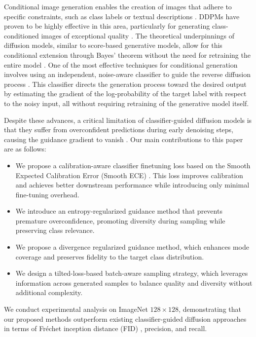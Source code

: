 \documentclass{article}
\begin{document}
Conditional image generation enables the creation of images that adhere to specific constraints, such as class labels or textual descriptions \cite{ramesh2021zero, rombach2022high, liu2024sora}. DDPMs have proven to be highly effective in this area, particularly for generating class-conditioned images of exceptional quality \cite{ho2020denoising, dhariwal2021diffusion, nichol2021improved}. The theoretical underpinnings of diffusion models, similar to score-based generative models, allow for this conditional extension through Bayes' theorem without the need for retraining the entire model \cite{song2023consistency, song2019generative, song2020score}. One of the most effective techniques for conditional generation involves using an independent, noise-aware classifier to guide the reverse diffusion process \cite{dhariwal2021diffusion, sohl2015deep, ma2023elucidating}. This classifier directs the generation process toward the desired output by estimating the gradient of the log-probability of the target label with respect to the noisy input, all without requiring retraining of the generative model itself.


Despite these advances, a critical limitation of classifier-guided diffusion models is that they suffer from overconfident predictions during early denoising steps, causing the guidance gradient to vanish \cite{ma2023elucidating, zheng2022entropy}. Our main contributions to this paper are as follows:
\begin{itemize}
\item {
We propose a calibration-aware classifier finetuning loss based on the Smooth Expected Calibration Error (Smooth ECE) \cite{naeini2015obtaining}. This loss improves calibration and achieves better downstream performance while introducing only minimal fine-tuning overhead.}
\item {
We introduce an entropy-regularized guidance method that prevents premature overconfidence, promoting diversity during sampling while preserving class relevance.}

\item {
We propose a divergence regularized guidance method, which enhances mode coverage and preserves fidelity to the target class distribution.}

\item {
We design a tilted-loss-based batch-aware sampling strategy, which leverages information across generated samples to balance quality and diversity without additional complexity.}


\end{itemize}
We conduct experimental analysis on ImageNet $128\times128$, demonstrating that our proposed methods outperform existing classifier-guided diffusion approaches in terms of Fréchet inception distance (FID) \cite{heusel2017gans}, precision, and recall.
\end{document}
